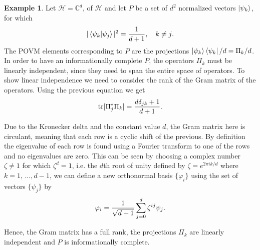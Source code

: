 \documentclass[a4paper,12pt]{wihuri}
\theoremstyle{definition}
\newtheorem{example}{Example}
\numberwithin{definition}{section}
\numberwithin{example}{section}
\numberwithin{theorem}{section}
\numberwithin{proposition}{section}
\numberwithin{lemma}{section}
\newcommand{\hi}{\mathcal{H}}%
\DeclareMathOperator{\tr}{tr}
\begin{document}
\begin{example}
Let $\hi = \mathbb{C}^d$, of $\hi$ and let $P$ be a set of $d^2$ normalized vectors $\ket{\psi_k}$, for which
\begin{align*}
|\braket{\psi_k|\psi_j}|^2 = \dfrac{1}{d+1}, \quad k \neq j \text.
\end{align*}
The POVM elements corresponding to $P$ are the projections $\ket{\psi_k}\bra{\psi_k}/d = \Pi_k/d$. In order to have an informationally complete $P$, the operators $\Pi_k$ must be linearly independent, since they need to span the entire space of operators. To show linear independence we need to consider the rank of the Gram matrix of the operators. Using the previous equation we get
\begin{align*}
\tr[\Pi_j^*\Pi_k]  = \dfrac{d\delta_{jk} + 1}{d + 1}\text.
\end{align*} 



Due to the Kronecker delta and the constant value $d$, the Gram matrix here is circulant, meaning that each row is a cyclic shift of the previous. By definition the eigenvalue of each row is found using a Fourier transform to one of the rows and no eigenvalues are zero. This can be seen by choosing a complex number $\zeta\neq 1$ for which $\zeta^d = 1$, i.e. the $d$th root of unity defined by $\zeta=e^{2\pi i k/d}$ where $k = 1,\,\dots,d-1$, we can define a new orthonormal basis $\lbrace \varphi_i \rbrace$ using the set of vectors $\lbrace \psi_j \rbrace$ by
\begin{align*}
\varphi_i = \dfrac{1}{\sqrt{d+1}}\sum_{j=0}^d \zeta^{ij}\psi_j\text.
\end{align*}

Hence, the Gram matrix has a full rank, the projections $\Pi_k$ are linearly independent and $P$ is informationally complete\cite{sic_povm}.

\end{example}

\end{document}
